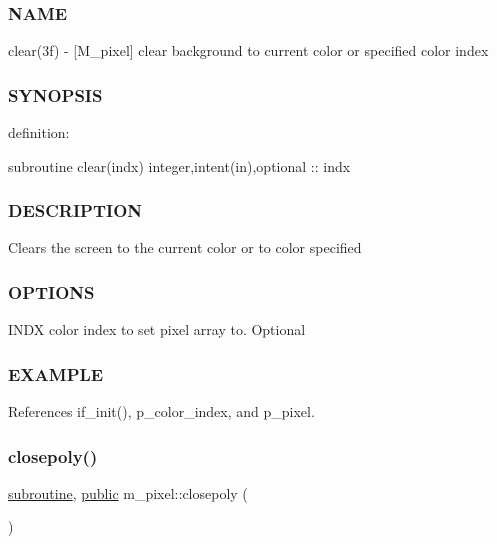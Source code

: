 \subsubsection*{N\+A\+ME}

clear(3f) -\/ \mbox{[}M\+\_\+pixel\mbox{]} clear background to current color or specified color index 

\subsubsection*{S\+Y\+N\+O\+P\+S\+IS}

definition\+:

subroutine clear(indx) integer,intent(in),optional \+:\+: indx

\subsubsection*{D\+E\+S\+C\+R\+I\+P\+T\+I\+ON}

Clears the screen to the current color or to color specified

\subsubsection*{O\+P\+T\+I\+O\+NS}

I\+N\+DX color index to set pixel array to. Optional

\subsubsection*{E\+X\+A\+M\+P\+LE}

References if\+\_\+init(), p\+\_\+color\+\_\+index, and p\+\_\+pixel.

\mbox{\label{namespacem__pixel_ab3dc83b63d2ab1bf3f63932abca4245d}} 
\subsubsection{\texorpdfstring{closepoly()}{closepoly()}}
{\footnotesize\ttfamily \hyperlink{M__stopwatch_83_8txt_acfbcff50169d691ff02d4a123ed70482}{subroutine}, \hyperlink{M__stopwatch_83_8txt_a2f74811300c361e53b430611a7d1769f}{public} m\+\_\+pixel\+::closepoly (\begin{DoxyParamCaption}{ }\end{DoxyParamCaption})}



